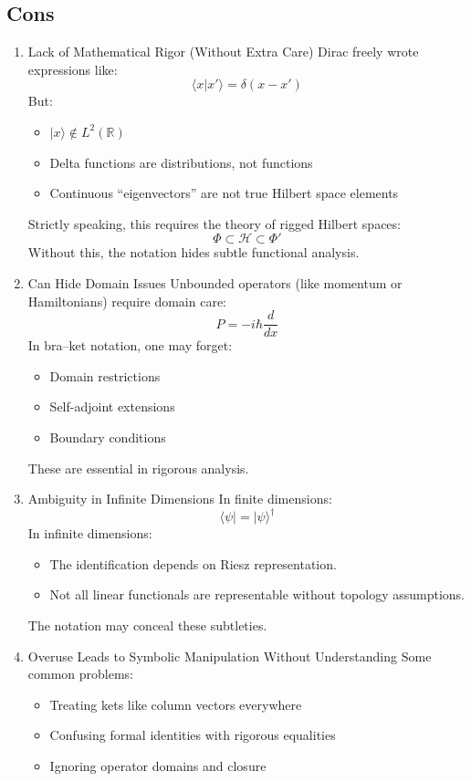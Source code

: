 \documentclass[12pt]{article}
\begin{document}
\subsection{ Cons}\label{cons}
\begin{enumerate}
   \item
Lack of Mathematical Rigor (Without Extra Care)
Dirac freely wrote expressions like:
\[\langle x|x' \rangle = \delta(x-x')\]
But:
\begin{itemize}
\item
  \(|x\rangle \notin L^2(\mathbb{R})\)
\item
  Delta functions are distributions, not functions
\item
  Continuous ``eigenvectors'' are not true Hilbert space elements
\end{itemize}
Strictly speaking, this requires the theory of rigged Hilbert spaces:
\[\Phi \subset \mathcal{H} \subset \Phi'\]
Without this, the notation hides subtle functional analysis.
   \item
Can Hide Domain Issues
Unbounded operators (like momentum or Hamiltonians) require domain care:
\[P = -i\hbar \frac{d}{dx}\]
In bra--ket notation, one may forget:
\begin{itemize}
\item
  Domain restrictions
\item
  Self-adjoint extensions
\item
  Boundary conditions
\end{itemize}
These are essential in rigorous analysis.
   \item
Ambiguity in Infinite Dimensions
In finite dimensions:
\[\langle \psi| = |\psi\rangle^\dagger\]
In infinite dimensions:
\begin{itemize}
\item
  The identification depends on Riesz representation.
\item
  Not all linear functionals are representable without topology
  assumptions.
\end{itemize}
The notation may conceal these subtleties.
   \item
 Overuse Leads to Symbolic Manipulation Without Understanding
Some common problems:
\begin{itemize}
\item
  Treating kets like column vectors everywhere
\item
  Confusing formal identities with rigorous equalities
\item
  Ignoring operator domains and closure
\end{itemize}

\end{enumerate}
\end{document}
